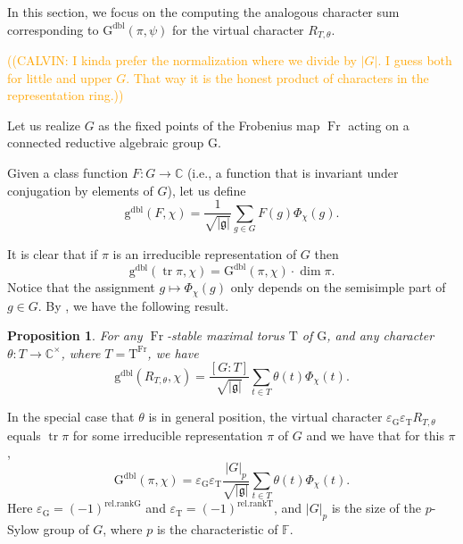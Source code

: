 \documentclass[12pt, reqno]{amsart}
\newtheorem{proposition}[theorem]{Proposition}
\theoremstyle{definition}
\theoremstyle{definition}
\theoremstyle{definition}
\newcommand{\cComplex}{\mathbb{C}}
\newcommand{\multiplicativegroup}[1]{#1^{\times}}
\newcommand{\sizeof}[1]{\left|#1\right|}
\newcommand{\fieldCharacter}{\psi}
\newcommand{\grpIndex}[2]{\left[#1:#2\right]}
\newcommand{\trace}{\operatorname{tr}}
\newcommand{\finiteField}{\mathbb{F}}
\newcommand{\Frobenius}{\operatorname{Fr}}
\newcommand{\dblGaussSumScalar}[2]{\mathrm{G}^{\mathrm{dbl}}\left(#1, #2\right)}
\newcommand{\dblVirtualGaussSumScalar}[2]{\mathrm{g}^{\mathrm{dbl}}\left(#1, #2\right)}
\newcommand{\lieAlgebra}{\mathfrak{g}}
\newcommand{\algebraicGroup}[1]{\boldsymbol{\mathrm{#1}}}
\newcommand{\calvin}[1]{\textcolor{orange}{\sffamily ((CALVIN: #1))}}
\begin{document}
In this section, we focus on the computing the analogous character sum corresponding to $\dblGaussSumScalar{\pi}{\fieldCharacter}$ for the virtual character $R_{T,\theta}$.

\calvin{I kinda prefer the normalization where we divide by $|G|$. I guess both for little and upper $G$. That way it is the honest product of characters in the representation ring.}

Let us realize $G$ as the fixed points of the Frobenius map $\Frobenius$ acting on a connected reductive algebraic group $\algebraicGroup{G}$.

Given a class function $F \colon G \to \cComplex$ (i.e., a function that is invariant under conjugation by elements of $G$), let us define $$\dblVirtualGaussSumScalar{F}{\chi} = \frac{1}{\sqrt{\sizeof{\lieAlgebra}}} \sum_{g \in G} F\left(g\right) \Phi_{\chi}\left(g\right).$$

It is clear that if $\pi$ is an irreducible representation of $G$ then $$\dblVirtualGaussSumScalar{\trace \pi}{\chi} = \dblGaussSumScalar{\pi}{\chi} \cdot \dim \pi.$$
Notice that the assignment $g \mapsto \Phi_{\chi}\left(g\right)$ only depends on the semisimple part of $g \in G$. By \cite[Theorem in Section 1.2]{SaitoShinoda2000}, we have the following result.
\begin{proposition}\label{prop:reduction-of-gauss-sum-to-torus}
	For any $\Frobenius$-stable maximal torus $\algebraicGroup{T}$ of $\algebraicGroup{G}$, and any character $\theta \colon T \to \multiplicativegroup{\cComplex}$, where $T = \algebraicGroup{T}^{\Frobenius}$, we have
	$$ \dblVirtualGaussSumScalar{R_{T, \theta}}{\chi} = \frac{\grpIndex{G}{T}}{\sqrt{\sizeof{\lieAlgebra}}} \sum_{t \in T} \theta\left(t\right) \Phi_{\chi}\left(t\right).$$
\end{proposition}
In the special case that $\theta$ is in general position, the virtual character $\varepsilon_{\algebraicGroup{G}} \varepsilon_{\algebraicGroup{T}} R_{T, \theta}$ equals $\trace \pi$ for some irreducible representation $\pi$ of $G$ and we have that for this $\pi$,
$$\dblGaussSumScalar{\pi}{\chi} = \varepsilon_{\algebraicGroup{G}} \varepsilon_{\algebraicGroup{T}} \frac{\sizeof{G}_p}{\sqrt{\sizeof{\lieAlgebra}}} \sum_{t \in T} \theta\left(t\right) \Phi_{\chi}\left(t\right).$$
Here $\varepsilon_{\algebraicGroup{G}} = \left(-1\right)^{\mathrm{rel.rank} \algebraicGroup{G}}$ and $\varepsilon_{\algebraicGroup{T}} = \left(-1\right)^{\mathrm{rel.rank} \algebraicGroup{T}}$, and $\sizeof{G}_p$ is the size of the $p$-Sylow group of $G$, where $p$ is the characteristic of $\finiteField$. 
\end{document}
